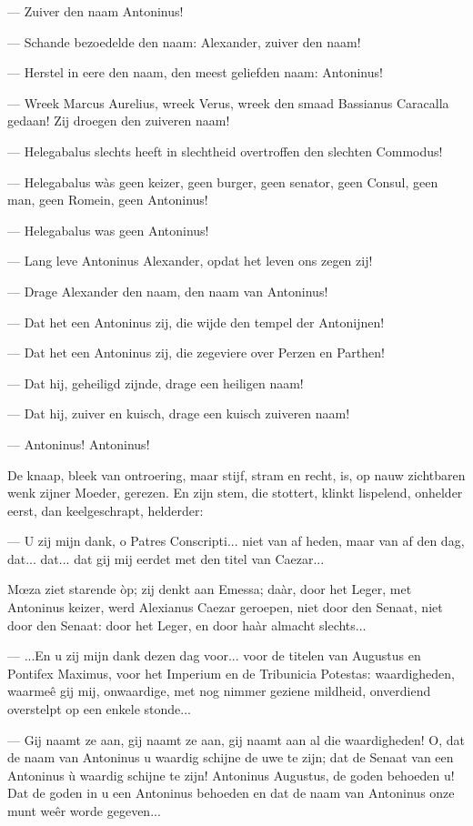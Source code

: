 \documentclass[a4paper, 12pt, oneside, dutch]{article}
\begin{document}
--- Zuiver den naam Antoninus!

--- Schande bezoedelde den naam: Alexander, zuiver den naam!

--- Herstel in eere den naam, den meest geliefden naam: Antoninus!

--- Wreek Marcus Aurelius, wreek Verus, wreek den smaad Bassianus Caracalla gedaan! Zij droegen den zuiveren naam!

--- Helegabalus slechts heeft in slechtheid overtroffen den slechten Commodus!

--- Helegabalus wàs geen keizer, geen burger, geen senator, geen Consul, geen man, geen Romein, geen Antoninus!

--- Helegabalus was geen Antoninus!

--- Lang leve Antoninus Alexander, opdat het leven ons zegen zij!

--- Drage Alexander den naam, den naam van Antoninus!

--- Dat het een Antoninus zij, die wijde den tempel der Antonijnen!

--- Dat het een Antoninus zij, die zegeviere over Perzen en Parthen!

--- Dat hij, geheiligd zijnde, drage een heiligen naam!

--- Dat hij, zuiver en kuisch, drage een kuisch zuiveren naam!

--- Antoninus! Antoninus!

De knaap, bleek van ontroering, maar stijf, stram en recht, is, op nauw zichtbaren wenk zijner Moeder, gerezen. En zijn stem, die stottert, klinkt lispelend, onhelder eerst, dan keelgeschrapt, helderder:

--- U zij mijn dank, o Patres Conscripti... niet van af heden, maar van af den dag, dat... dat... dat gij mij eerdet met den titel van Caezar...

Mœza ziet starende òp; zij denkt aan Emessa; daàr, door het Leger, met Antoninus keizer, werd Alexianus Caezar geroepen, niet door den Senaat, niet door den Senaat: door het Leger, en door haàr almacht slechts...

--- ...En u zij mijn dank dezen dag voor... voor de titelen van Augustus en Pontifex Maximus, voor het Imperium en de Tribunicia Potestas: waardigheden, waarmeê gij mij, onwaardige, met nog nimmer geziene mildheid, onverdiend overstelpt op een enkele stonde...

--- Gij naamt ze aan, gij naamt ze aan, gij naamt aan al die waardigheden! O, dat de naam van Antoninus u waardig schijne de uwe te zijn; dat de Senaat van een Antoninus ù waardig schijne te zijn! Antoninus Augustus, de goden behoeden u! Dat de goden in u een Antoninus behoeden en dat de naam van Antoninus onze munt weêr worde gegeven...
\end{document}
